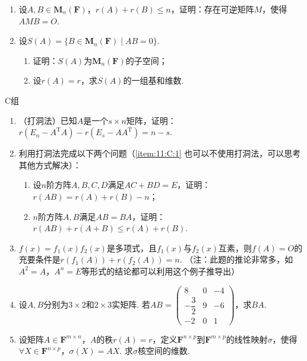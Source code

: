 \begin{enumerate}
    \item 设$A,B \in \mathbf{M}_n(\mathbf{F})$，$r(A)+r(B) \leqslant n$，证明：存在可逆矩阵$M$，使得$AMB=O$.

    \item 设$S(A)=\{B \in \mathbf{M}_n(\mathbf{F}) \mid AB=0\}$.
          \begin{enumerate}
              \item 证明：$S(A)$为$\mathbf{M}_n(\mathbf{F})$的子空间；

              \item 设$r(A)=r$，求$S(A)$的一组基和维数.
          \end{enumerate}
\end{enumerate}

\centerline{\heiti C组}
\begin{enumerate}
    \item （打洞法）已知$A$是一个$s \times n$矩阵，证明：$r(E_n-A^\mathrm{T}A)-r(E_s-AA^\mathrm{T})=n-s$.

    \item 利用打洞法完成以下两个问题（\ref*{item:11:C:1} 也可以不使用打洞法，可以思考其他方式解决）：
          \begin{enumerate}
              \item 设$n$阶方阵$A,B,C,D$满足$AC+BD=E$，证明：$r(AB) = r(A)+r(B)-n$；

              \item \label{item:11:C:1}
                    $n$阶方阵$A,B$满足$AB=BA$，证明：$r(AB)+r(A+B)\leqslant r(A)+r(B)$.
          \end{enumerate}

    \item $f(x)=f_1(x)f_2(x)$是多项式，且$f_1(x)$与$f_2(x)$互素，则$f(A)=O$的充要条件是$r(f_1(A))+r(f_2(A))=n$. （注：此题的推论非常多，如$A^2=A$，$A^n=E$等形式的结论都可以利用这个例子推导出）

    \item 设$A,B$分别为$3 \times 2$和$2 \times 3$实矩阵. 若$AB=\begin{pmatrix}
                  8             & 0 & -4 \\[1ex]
                  -\dfrac{3}{2} & 9 & -6 \\[1ex]
                  -2            & 0 & 1
              \end{pmatrix}$，求$BA$.

    \item 设矩阵$A \in \mathbf{F}^{m \times n}$，$A$的秩$r(A)=r$，定义$\mathbf{F}^{n \times p}$到$\mathbf{F}^{m \times p}$的线性映射$\sigma$，使得$\forall X \in \mathbf{F}^{n \times p}$，$\sigma(X)=AX$. 求$\sigma$核空间的维数.
\end{enumerate}
